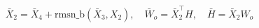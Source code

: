 \documentclass{article}
\begin{document}
\begin{preview}

\[ \bar X_2 = \bar X_4 + \mathrm{rmsn\_b}(\bar X_3, X_2),\quad \bar W_o = \bar X_2^\top H,\quad \bar H = \bar X_2 W_o \]

\end{preview}
\end{document}
